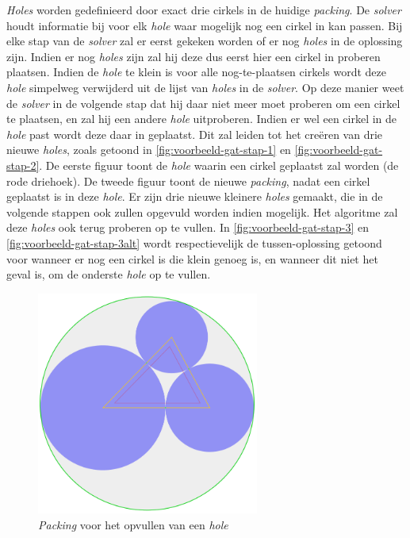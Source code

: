 \documentclass[12pt,a4paper,oneside]{book}
\begin{document}
\textit{Holes} worden gedefinieerd door exact drie cirkels in de huidige \textit{packing}.
De \textit{solver} houdt informatie bij voor elk \textit{hole} waar mogelijk nog een cirkel in kan passen.
Bij elke stap van de \textit{solver} zal er eerst gekeken worden of er nog \textit{holes} in de oplossing zijn.
Indien er nog \textit{holes} zijn zal hij deze dus eerst hier een cirkel in proberen plaatsen.
Indien de \textit{hole} te klein is voor alle nog-te-plaatsen cirkels wordt deze \textit{hole} simpelweg verwijderd uit de lijst van \textit{holes} in de \textit{solver}.
Op deze manier weet de \textit{solver} in de volgende stap dat hij daar niet meer moet proberen om een cirkel te plaatsen, en zal hij een andere \textit{hole} uitproberen.
Indien er wel een cirkel in de \textit{hole} past wordt deze daar in geplaatst.
Dit zal leiden tot het creëren van drie nieuwe \textit{holes}, zoals getoond in \autoref{fig:voorbeeld-gat-stap-1} en \autoref{fig:voorbeeld-gat-stap-2}.
De eerste figuur toont de \textit{hole} waarin een cirkel geplaatst zal worden (de rode driehoek).
De tweede figuur toont de nieuwe \textit{packing}, nadat een cirkel geplaatst is in deze \textit{hole}.
Er zijn drie nieuwe kleinere \textit{holes} gemaakt, die in de volgende stappen ook zullen opgevuld worden indien mogelijk.
Het algoritme zal deze \textit{holes} ook terug proberen op te vullen.
In \autoref{fig:voorbeeld-gat-stap-3} en \autoref{fig:voorbeeld-gat-stap-3alt} wordt respectievelijk de tussen-oplossing getoond voor wanneer er nog een cirkel is die klein genoeg is, en wanneer dit niet het geval is, om de onderste \textit{hole} op te vullen.

\begin{figure}
  \centering
  \includegraphics[width=0.65\textwidth]{voorbeeld-gat-stap-1.png}
  \caption{\textit{Packing} voor het opvullen van een \textit{hole}} \label{fig:voorbeeld-gat-stap-1} 
\end{figure}
\end{document}
